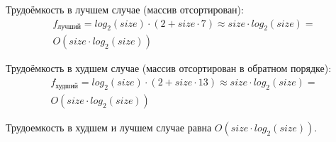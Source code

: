 Трудоёмкость в лучшем случае (массив отсортирован):
\begin{equation}
	\begin{array}{cc}
		f_{\text{лучший}} = log_2(size) \cdot (2 + size \cdot 7) \approx  size \cdot log_2(size) =\\ O(size \cdot log_2(size))  
	\end{array}
\end{equation}
\pagebreak

Трудоёмкость в худшем случае (массив отсортирован в обратном порядке):
\begin{equation}
	\begin{array}{cc}
		f_{\text{худший}} = log_2(size) \cdot (2 + size \cdot 13) \approx  size \cdot log_2(size) = \\O(size \cdot log_2(size))             
	\end{array}
\end{equation}

Трудоемкость в худшем и лучшем случае равна $O(size \cdot log_2(size))$.
